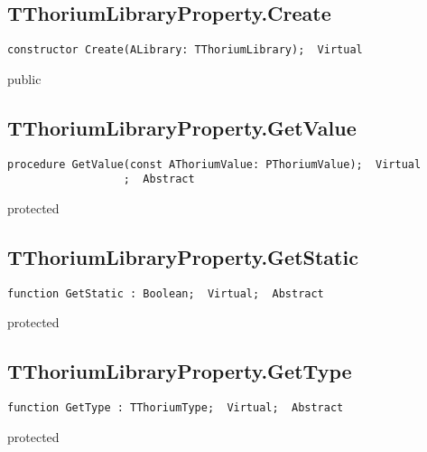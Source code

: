 \subsection{TThoriumLibraryProperty.Create}
\label{thoriumcore:thorium:tthoriumlibraryproperty:create}
\begin{FPCList}
\Synopsis
\Declaration 

\begin{verbatim}
constructor Create(ALibrary: TThoriumLibrary);  Virtual
\end{verbatim}
\Visibility
public
\Description
\Errors
\end{FPCList}
\subsection{TThoriumLibraryProperty.GetValue}
\label{thoriumcore:thorium:tthoriumlibraryproperty:getvalue}
\begin{FPCList}
\Synopsis
\Declaration 

\begin{verbatim}
procedure GetValue(const AThoriumValue: PThoriumValue);  Virtual
                  ;  Abstract
\end{verbatim}
\Visibility
protected
\Description
\Errors
\end{FPCList}
\subsection{TThoriumLibraryProperty.GetStatic}
\label{thoriumcore:thorium:tthoriumlibraryproperty:getstatic}
\begin{FPCList}
\Synopsis
\Declaration 

\begin{verbatim}
function GetStatic : Boolean;  Virtual;  Abstract
\end{verbatim}
\Visibility
protected
\Description
\Errors
\end{FPCList}
\subsection{TThoriumLibraryProperty.GetType}
\label{thoriumcore:thorium:tthoriumlibraryproperty:gettype}
\begin{FPCList}
\Synopsis
\Declaration 

\begin{verbatim}
function GetType : TThoriumType;  Virtual;  Abstract
\end{verbatim}
\Visibility
protected
\Description
\Errors
\end{FPCList}

